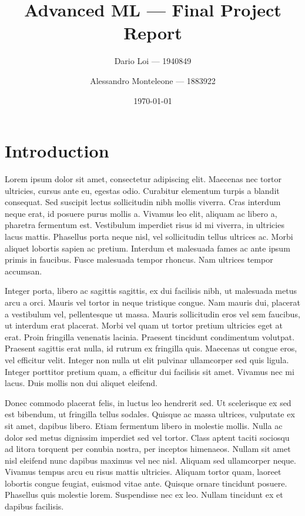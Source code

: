 \documentclass{IEEEtran}
\author{Dario Loi --- 1940849 \\ \and Alessandro Monteleone --- 1883922}
\title{Advanced ML --- Final Project Report}
\date{\today}
\begin{document}
\lstset{language=Python}

\maketitle

\tableofcontents

\section{Introduction}



Lorem ipsum dolor sit amet, consectetur adipiscing elit. Maecenas nec tortor ultricies, cursus ante eu, egestas odio. Curabitur elementum turpis a blandit consequat. Sed suscipit lectus sollicitudin nibh mollis viverra. Cras interdum neque erat, id posuere purus mollis a. Vivamus leo elit, aliquam ac libero a, pharetra fermentum est. Vestibulum imperdiet risus id mi viverra, in ultricies lacus mattis. Phasellus porta neque nisl, vel sollicitudin tellus ultrices ac. Morbi aliquet lobortis sapien ac pretium. Interdum et malesuada fames ac ante ipsum primis in faucibus. Fusce malesuada tempor rhoncus. Nam ultrices tempor accumsan.

Integer porta, libero ac sagittis sagittis, ex dui facilisis nibh, ut malesuada metus arcu a orci. Mauris vel tortor in neque tristique congue. Nam mauris dui, placerat a vestibulum vel, pellentesque ut massa. Mauris sollicitudin eros vel sem faucibus, ut interdum erat placerat. Morbi vel quam ut tortor pretium ultricies eget at erat. Proin fringilla venenatis lacinia. Praesent tincidunt condimentum volutpat. Praesent sagittis erat nulla, id rutrum ex fringilla quis. Maecenas ut congue eros, vel efficitur velit. Integer non nulla ut elit pulvinar ullamcorper sed quis ligula. Integer porttitor pretium quam, a efficitur dui facilisis sit amet. Vivamus nec mi lacus. Duis mollis non dui aliquet eleifend.

Donec commodo placerat felis, in luctus leo hendrerit sed. Ut scelerisque ex sed est bibendum, ut fringilla tellus sodales. Quisque ac massa ultrices, vulputate ex sit amet, dapibus libero. Etiam fermentum libero in molestie mollis. Nulla ac dolor sed metus dignissim imperdiet sed vel tortor. Class aptent taciti sociosqu ad litora torquent per conubia nostra, per inceptos himenaeos. Nullam sit amet nisl eleifend nunc dapibus maximus vel nec nisl. Aliquam sed ullamcorper neque. Vivamus tempus arcu eu risus mattis ultricies. Aliquam tortor quam, laoreet lobortis congue feugiat, euismod vitae ante. Quisque ornare tincidunt posuere. Phasellus quis molestie lorem. Suspendisse nec ex leo. Nullam tincidunt ex et dapibus facilisis.
\end{document}

